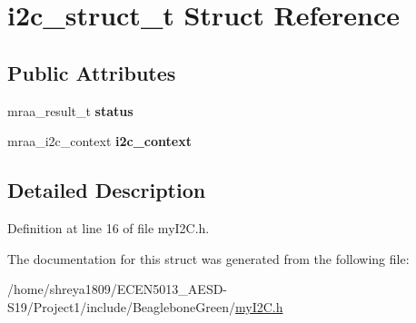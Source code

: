 \hypertarget{structi2c__struct__t}{}\section{i2c\+\_\+struct\+\_\+t Struct Reference}
\label{structi2c__struct__t}
\subsection*{Public Attributes}
\begin{DoxyCompactItemize}
\item 
\mbox{\label{structi2c__struct__t_a220f85831945900c2b99ae0f1a338944}} 
mraa\+\_\+result\+\_\+t {\bfseries status}
\item 
\mbox{\label{structi2c__struct__t_ac7c93248045c6c2f56438fae7cda1a75}} 
mraa\+\_\+i2c\+\_\+context {\bfseries i2c\+\_\+context}
\end{DoxyCompactItemize}


\subsection{Detailed Description}


Definition at line 16 of file my\+I2\+C.\+h.



The documentation for this struct was generated from the following file\+:\begin{DoxyCompactItemize}
\item 
/home/shreya1809/\+E\+C\+E\+N5013\+\_\+\+A\+E\+S\+D-\/\+S19/\+Project1/include/\+Beaglebone\+Green/\hyperlink{myI2C_8h}{my\+I2\+C.\+h}\end{DoxyCompactItemize}

